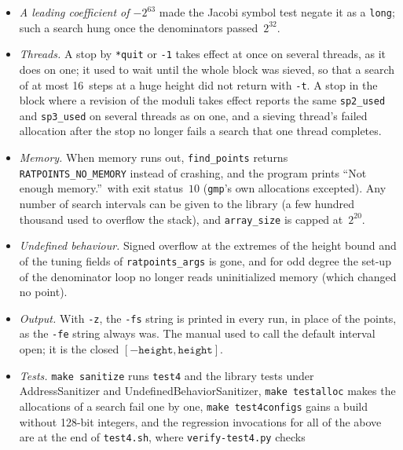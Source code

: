 \documentclass[12pt,a4paper,oneside]{amsart}
\begin{document}
\begin{itemize}
{        62} missed $(1:0:103)$). Its sign tests use \texttt{mpz\_sgn} instead
        of relying on \texttt{gmp.h} to turn \texttt{mpz\_cmp\_si(x, 0)} into
        it.
  \item \emph{A leading coefficient of $-2^{63}$} made the Jacobi symbol test
        negate it as a \texttt{long}; such a search hung once the
        denominators passed~$2^{32}$.
  \item \emph{Threads.} A stop by \texttt{*quit} or \verb+-1+ takes effect at
        once on several threads, as it does on one; it used to wait until the
        whole block was sieved, so that a search of at most 16~steps at a huge
        height did not return with \verb+-t+. A stop in the block where a
        revision of the moduli takes effect reports the same
        \texttt{sp2\_used} and \texttt{sp3\_used} on several threads as on
        one, and a sieving thread's failed allocation after the stop no longer
        fails a search that one thread completes.
  \item \emph{Memory.} When memory runs out, \texttt{find\_points} returns
        \texttt{RATPOINTS\_NO\_MEMORY} instead of crashing, and the program
        prints ``Not enough memory.''\ with exit status~$10$ (\texttt{gmp}'s
        own allocations excepted). Any number of search
        intervals can be given to the library (a few hundred thousand used to
        overflow the stack), and \texttt{array\_size} is capped at~$2^{20}$.
  \item \emph{Undefined behaviour.} Signed overflow at the extremes of the
        height bound and of the tuning fields of \texttt{ratpoints\_args} is
        gone, and for odd degree the set-up of the denominator loop no longer
        reads uninitialized memory (which changed no point).
  \item \emph{Output.} With \verb+-z+, the \verb+-fs+ string is printed in
        every run, in place of the points, as the \verb+-fe+ string always
        was. The manual used to call the default interval open; it is the
        closed $[-\texttt{height}, \texttt{height}]$.
  \item \emph{Tests.} \texttt{make sanitize} runs \texttt{test4} and the
        library tests under AddressSanitizer and UndefinedBehaviorSanitizer,
        \texttt{make testalloc} makes the allocations of a search fail one by
        one, \texttt{make test4configs} gains a build without 128-bit
        integers, and the regression invocations for all of the above are at
        the end of \texttt{test4.sh}, where \texttt{verify-test4.py} checks

\end{itemize}
\end{document}
